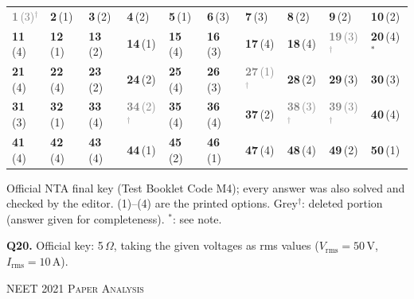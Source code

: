 {\small\setlength{\tabcolsep}{1pt}\renewcommand{\arraystretch}{1.5}
\begin{tabularx}{\linewidth}{@{}*{10}{>{\centering\arraybackslash}X}@{}}\toprule
\textcolor{gray}{\textbf{1}\,(3)$^{\dagger}$} & \textbf{2}\,(1) & \textbf{3}\,(2) & \textbf{4}\,(2) & \textbf{5}\,(1) & \textbf{6}\,(3) & \textbf{7}\,(3) & \textbf{8}\,(2) & \textbf{9}\,(2) & \textbf{10}\,(2)\\
\textbf{11}\,(4) & \textbf{12}\,(1) & \textbf{13}\,(2) & \textbf{14}\,(1) & \textbf{15}\,(4) & \textbf{16}\,(3) & \textbf{17}\,(4) & \textbf{18}\,(4) & \textcolor{gray}{\textbf{19}\,(3)$^{\dagger}$} & \textbf{20}\,(4)$^{*}$\\
\textbf{21}\,(4) & \textbf{22}\,(4) & \textbf{23}\,(2) & \textbf{24}\,(2) & \textbf{25}\,(4) & \textbf{26}\,(3) & \textcolor{gray}{\textbf{27}\,(1)$^{\dagger}$} & \textbf{28}\,(2) & \textbf{29}\,(3) & \textbf{30}\,(3)\\
\textbf{31}\,(3) & \textbf{32}\,(1) & \textbf{33}\,(4) & \textcolor{gray}{\textbf{34}\,(2)$^{\dagger}$} & \textbf{35}\,(4) & \textbf{36}\,(4) & \textbf{37}\,(2) & \textcolor{gray}{\textbf{38}\,(3)$^{\dagger}$} & \textcolor{gray}{\textbf{39}\,(3)$^{\dagger}$} & \textbf{40}\,(4)\\
\textbf{41}\,(4) & \textbf{42}\,(4) & \textbf{43}\,(4) & \textbf{44}\,(1) & \textbf{45}\,(2) & \textbf{46}\,(1) & \textbf{47}\,(4) & \textbf{48}\,(4) & \textbf{49}\,(2) & \textbf{50}\,(1)\\\bottomrule\end{tabularx}}\par\smallskip
{\footnotesize Official NTA final key (Test Booklet Code M4); every answer was also solved and checked by the editor. (1)--(4) are the printed options. {\color{gray}Grey$^{\dagger}$}: deleted portion (answer given for completeness). $^{*}$: see note.\par
\par\smallskip\textbf{Q20.} Official key: 5\,$\Omega$, taking the given voltages as rms values ($V_{\text{rms}}=50$\,V, $I_{\text{rms}}=10$\,A).
}\par
\clearpage
\begin{center}{}\par
{\fontsize{20}{24}\selectfont\color{navy}\scshape NEET 2021 \textperiodcentered{} Paper Analysis}\par
{\color{gilt}}\end{center}
\vspace{4pt}
